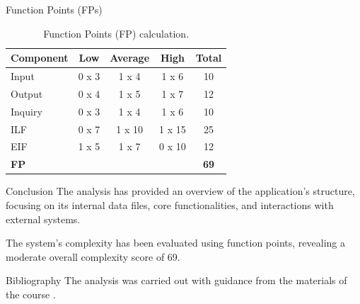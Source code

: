 \documentclass[12pt]{beamer}
\begin{document}
\begin{frame}[allowframebreaks]{Function Points (FPs)}
\scriptsize

\begin{table}
    \centering
    \begin{tabular}{|l|c|c|c|c|}
        \hline
        \textbf{Component}
        & \textbf{Low}
        & \textbf{Average}
        & \textbf{High}
        & \textbf{Total} \\
        \hline
        Input
        & 0 x 3
        & 1 x 4
        & 1 x 6
        & 10 \\
        Output
        & 0 x 4
        & 1 x 5
        & 1 x 7
        & 12 \\
        Inquiry & 0 x 3
        & 1 x 4
        & 1 x 6
        & 10 \\
        ILF
        & 0 x 7
        & 1 x 10
        & 1 x 15
        & 25 \\
        EIF
        & 1 x 5
        & 1 x 7
        & 0 x 10
        & 12 \\
        \hline
        \textbf{FP} &
        & 
        &
        & \textbf{69} \\
        \hline
    \end{tabular}
    \caption{Function Points (FP) calculation.}
    \label{tab:1-2}
\end{table}
\end{frame}

\begin{frame}[allowframebreaks]{Conclusion}
The analysis has provided an overview of the application's structure, focusing on its internal data files, core functionalities, and interactions with external systems.

\bigskip

The system's complexity has been evaluated using function points, revealing a moderate overall complexity score of 69.
\end{frame}

% 
% 
\begin{frame}[allowframebreaks]{Bibliography}
The analysis was carried out with guidance from the materials of the course \cite{lavazza2024functional}.

\bigskip



\end{frame}
% 
% 
\end{document}
